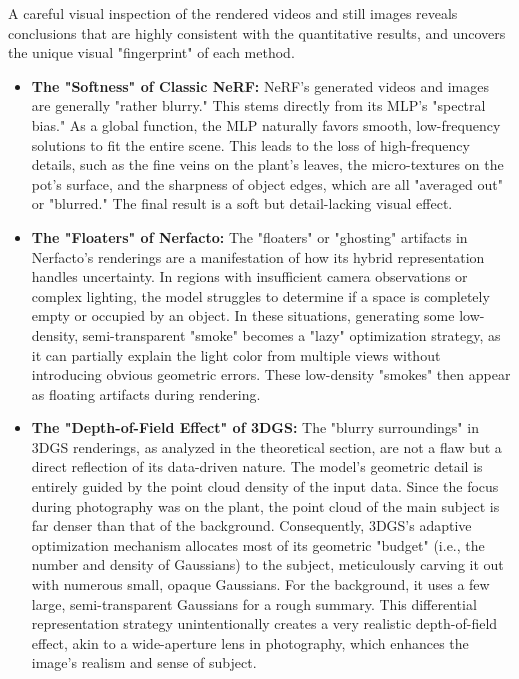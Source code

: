 \documentclass[11pt]{article}
\begin{document}
A careful visual inspection of the rendered videos and still images reveals conclusions that are highly consistent with the quantitative results, and uncovers the unique visual "fingerprint" of each method.
\begin{itemize}
    \item \textbf{The "Softness" of Classic NeRF:} NeRF's generated videos and images are generally "rather blurry." This stems directly from its MLP's "spectral bias." As a global function, the MLP naturally favors smooth, low-frequency solutions to fit the entire scene. This leads to the loss of high-frequency details, such as the fine veins on the plant's leaves, the micro-textures on the pot's surface, and the sharpness of object edges, which are all "averaged out" or "blurred." The final result is a soft but detail-lacking visual effect.
    \item \textbf{The "Floaters" of Nerfacto:} The "floaters" or "ghosting" artifacts in Nerfacto's renderings are a manifestation of how its hybrid representation handles uncertainty. In regions with insufficient camera observations or complex lighting, the model struggles to determine if a space is completely empty or occupied by an object. In these situations, generating some low-density, semi-transparent "smoke" becomes a "lazy" optimization strategy, as it can partially explain the light color from multiple views without introducing obvious geometric errors. These low-density "smokes" then appear as floating artifacts during rendering.
    \item \textbf{The "Depth-of-Field Effect" of 3DGS:} The "blurry surroundings" in 3DGS renderings, as analyzed in the theoretical section, are not a flaw but a direct reflection of its data-driven nature. The model's geometric detail is entirely guided by the point cloud density of the input data. Since the focus during photography was on the plant, the point cloud of the main subject is far denser than that of the background. Consequently, 3DGS's adaptive optimization mechanism allocates most of its geometric "budget" (i.e., the number and density of Gaussians) to the subject, meticulously carving it out with numerous small, opaque Gaussians. For the background, it uses a few large, semi-transparent Gaussians for a rough summary. This differential representation strategy unintentionally creates a very realistic depth-of-field effect, akin to a wide-aperture lens in photography, which enhances the image's realism and sense of subject.
\end{itemize}
\end{document}

